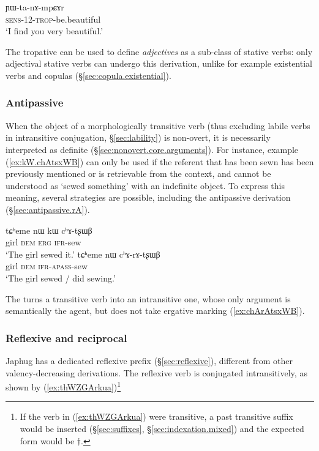 \begin{exe}
\ex  \label{ex:YWtanAmpCAr}
\gll ɲɯ-ta-nɤ-mpɕɤr \\
\textsc{sens}-1\fl{}2-\textsc{trop}-be.beautiful \\
\glt `I find you very beautiful.' 
\end{exe}

The tropative can be used to define \textit{adjectives} as a sub-class of stative verbs: only adjectival stative verbs can undergo this derivation, unlike for example existential verbs and copulas (§\ref{sec:copula.existential}).

\subsubsection{Antipassive}
When the object of a morphologically transitive verb (thus excluding labile verbs in intransitive conjugation, §\ref{sec:lability}) is non-overt, it is necessarily interpreted as definite (§\ref{sec:nonovert.core.arguments}). For instance, example (\ref{ex:kW.chAtsxWB}) can only be used if the referent that has been sewn has been previously mentioned or is retrievable from the context, and cannot be understood as `sewed something' with an indefinite object. To express this meaning, several strategies are possible, including the antipassive  derivation (§\ref{sec:antipassive.rA}). 

\begin{exe}
\ex 
\begin{xlist}
\ex \label{ex:kW.chAtsxWB}
\gll tɕʰeme nɯ kɯ cʰɤ-tʂɯβ \\
girl \textsc{dem} \textsc{erg}  \textsc{ifr}-sew \\
\glt `The girl sewed it.' 
\ex \label{ex:chArAtsxWB}
\gll  tɕʰeme nɯ cʰɤ-rɤ-tʂɯβ \\
 girl \textsc{dem}  \textsc{ifr}-\textsc{apass}-sew \\
 \glt `The girl sewed / did sewing.' 
 \end{xlist}
  \end{exe}

The  turns a transitive verb into an intransitive one, whose only argument is semantically the agent, but does not take ergative marking  (\ref{ex:chArAtsxWB}).

\subsubsection{Reflexive and reciprocal}
Japhug has a dedicated reflexive prefix  (§\ref{sec:reflexive}), different from other valency-decreasing derivations. The reflexive verb is conjugated intransitively, as shown by (\ref{ex:thWZGArkua})\footnote{If the verb in (\ref{ex:thWZGArkua}) were transitive, a past transitive  suffix would be inserted (§\ref  {sec:suffixes}, §\ref{sec:indexation.mixed}) and the expected form would be $\dagger$. }
 

